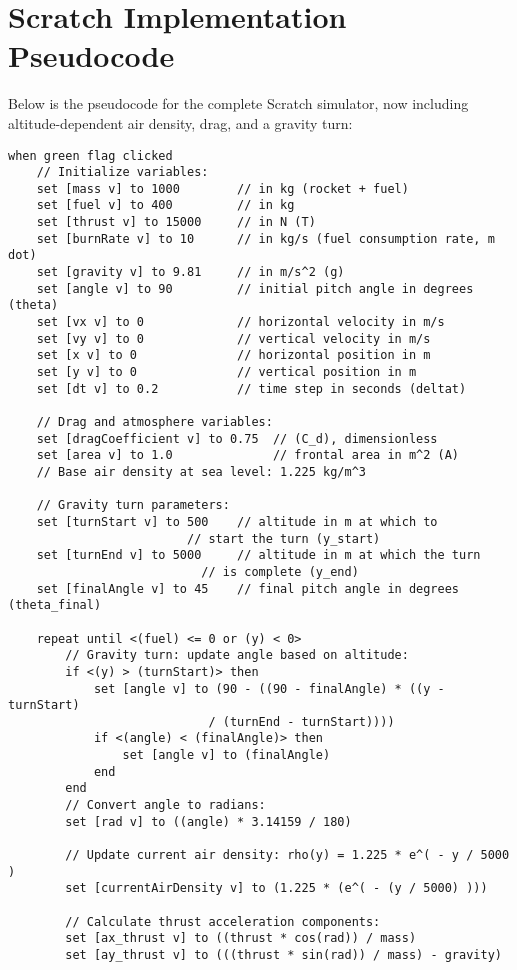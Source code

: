 \documentclass[12pt]{article}
\begin{document}
\section{Scratch Implementation Pseudocode}
Below is the pseudocode for the complete Scratch simulator,
now including altitude-dependent air density, drag, and a gravity turn:
\begin{verbatim}
when green flag clicked
    // Initialize variables:
    set [mass v] to 1000        // in kg (rocket + fuel)
    set [fuel v] to 400         // in kg
    set [thrust v] to 15000     // in N (T)
    set [burnRate v] to 10      // in kg/s (fuel consumption rate, m dot)
    set [gravity v] to 9.81     // in m/s^2 (g)
    set [angle v] to 90         // initial pitch angle in degrees (theta)
    set [vx v] to 0             // horizontal velocity in m/s
    set [vy v] to 0             // vertical velocity in m/s
    set [x v] to 0              // horizontal position in m
    set [y v] to 0              // vertical position in m
    set [dt v] to 0.2           // time step in seconds (deltat)
    
    // Drag and atmosphere variables:
    set [dragCoefficient v] to 0.75  // (C_d), dimensionless
    set [area v] to 1.0              // frontal area in m^2 (A)
    // Base air density at sea level: 1.225 kg/m^3
    
    // Gravity turn parameters:
    set [turnStart v] to 500    // altitude in m at which to
    					 // start the turn (y_start)
    set [turnEnd v] to 5000     // altitude in m at which the turn
    					   // is complete (y_end)
    set [finalAngle v] to 45    // final pitch angle in degrees (theta_final)

    repeat until <(fuel) <= 0 or (y) < 0>
        // Gravity turn: update angle based on altitude:
        if <(y) > (turnStart)> then
            set [angle v] to (90 - ((90 - finalAngle) * ((y - turnStart)
            				/ (turnEnd - turnStart))))
            if <(angle) < (finalAngle)> then
                set [angle v] to (finalAngle)
            end
        end
        // Convert angle to radians:
        set [rad v] to ((angle) * 3.14159 / 180)
        
        // Update current air density: rho(y) = 1.225 * e^( - y / 5000 )
        set [currentAirDensity v] to (1.225 * (e^( - (y / 5000) )))
        
        // Calculate thrust acceleration components:
        set [ax_thrust v] to ((thrust * cos(rad)) / mass)
        set [ay_thrust v] to (((thrust * sin(rad)) / mass) - gravity)
        

\end{verbatim}
\end{document}
